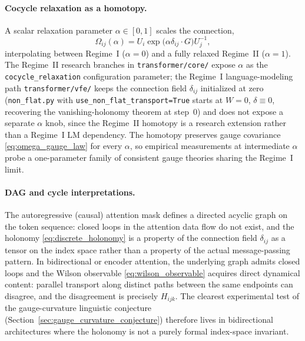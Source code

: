 \documentclass[11pt]{article}
\begin{document}
\paragraph{Cocycle relaxation as a homotopy.} A scalar relaxation parameter $\alpha \in [0,1]$ scales the connection,
\begin{equation}
\Omega_{ij}(\alpha) = U_i \exp\big(\alpha \delta_{ij}\cdot G\big) U_j^{-1},
\end{equation}
interpolating between Regime~I ($\alpha = 0$) and a fully relaxed Regime~II ($\alpha = 1$). The Regime~II research branches in \texttt{transformer/core/} expose $\alpha$ as the \texttt{cocycle\_relaxation} configuration parameter; the Regime~I language-modeling path \texttt{transformer/vfe/} keeps the connection field $\delta_{ij}$ initialized at zero (\texttt{non\_flat.py} with \texttt{use\_non\_flat\_transport=True} starts at $W = 0$, $\delta \equiv 0$, recovering the vanishing-holonomy theorem at step~0) and does not expose a separate $\alpha$ knob, since the Regime~II homotopy is a research extension rather than a Regime~I LM dependency. The homotopy preserves gauge covariance \eqref{eq:omega_gauge_law} for every $\alpha$, so empirical measurements at intermediate $\alpha$ probe a one-parameter family of consistent gauge theories sharing the Regime~I limit.

\paragraph{DAG and cycle interpretations.} The autoregressive (causal) attention mask defines a directed acyclic graph on the token sequence: closed loops in the attention data flow do not exist, and the holonomy \eqref{eq:discrete_holonomy} is a property of the connection field $\delta_{ij}$ as a tensor on the index space rather than a property of the actual message-passing pattern. In bidirectional or encoder attention, the underlying graph admits closed loops and the Wilson observable \eqref{eq:wilson_observable} acquires direct dynamical content: parallel transport along distinct paths between the same endpoints can disagree, and the disagreement is precisely $H_{ijk}$. The clearest experimental test of the gauge-curvature linguistic conjecture (Section~\ref{sec:gauge_curvature_conjecture}) therefore lives in bidirectional architectures where the holonomy is not a purely formal index-space invariant.
\end{document}
